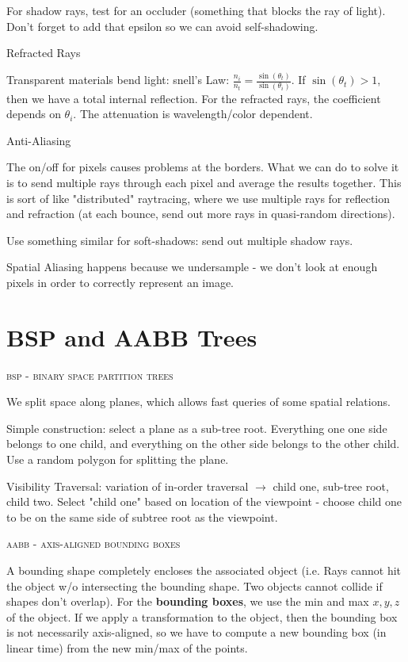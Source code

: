 \documentclass{article}
\begin{document}
For shadow rays, test for an occluder (something that blocks the ray of light). Don't forget to add that epsilon so we can avoid self-shadowing.

\vspace{10pt}
Refracted Rays

Transparent materials bend light: snell's Law: $\frac{n_i}{n_t} = \frac{\sin(\theta_t)}{\sin(\theta_i)} $. If $\sin(\theta_t) > 1$, then we have a total internal reflection. For the refracted rays, the coefficient depends on $\theta_i$. The attenuation is wavelength/color dependent.

\vspace{10pt}
Anti-Aliasing

The on/off for pixels causes problems at the borders. What we can do to solve it is to send multiple rays through each pixel and average the results together. This is sort of like "distributed" raytracing, where we use multiple rays for reflection and refraction (at each bounce, send out more rays in quasi-random directions).

Use something similar for soft-shadows: send out multiple shadow rays.

Spatial Aliasing happens because we undersample - we don't look at enough pixels in order to correctly represent an image.
\section{BSP and AABB Trees} %
\label{sec:bsp_and_aab}
\begin{center}\textsc{bsp - binary space partition trees}\end{center} 
We split space along planes, which allows fast queries of some spatial relations.

Simple construction: select a plane as a sub-tree root. Everything one one side belongs to one child, and everything on the other side belongs to the other child. Use a random polygon for splitting the plane.

Visibility Traversal: variation of in-order traversal $\rightarrow$ child one, sub-tree root, child two. Select "child one" based on location of the viewpoint - choose child one to be on the same side of subtree root as the viewpoint.

\begin{center}\textsc{aabb - axis-aligned bounding boxes}\end{center} 
A bounding shape completely encloses the associated object (i.e. Rays cannot hit the object w/o intersecting the bounding shape. Two objects cannot collide if shapes don't overlap). For the {\bf bounding boxes}, we use the min and max $x,y,z$ of the object. If we apply a transformation to the object, then the bounding box is not necessarily axis-aligned, so we have to compute a new bounding box (in linear time) from the new min/max of the points.
\end{document}
